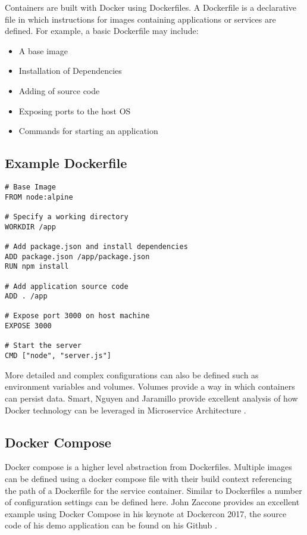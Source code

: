 \documentclass[journal]{IEEEtran}
\begin{document}
Containers are built with Docker using Dockerfiles\cite{dockerfile}. A Dockerfile is a declarative file in which instructions for images containing applications or services are defined. For example, a basic Dockerfile may include:

\begin{itemize}
\item
A base image

\item
Installation of Dependencies

\item
Adding of source code

\item
Exposing ports to the host OS

\item
Commands for starting an application
\end{itemize}

\subsection*{ Example Dockerfile }

\begin{verbatim}
# Base Image
FROM node:alpine

# Specify a working directory
WORKDIR /app

# Add package.json and install dependencies
ADD package.json /app/package.json
RUN npm install

# Add application source code
ADD . /app

# Expose port 3000 on host machine
EXPOSE 3000

# Start the server
CMD ["node", "server.js"]
\end{verbatim}

More detailed and complex configurations can also be defined such as environment variables and volumes. Volumes provide a way in which containers can persist data. Smart, Nguyen and Jaramillo provide excellent analysis of how Docker technology can be leveraged in Microservice Architecture \cite{LeveragingMicroservicesArchDocker}.

\subsection*{ Docker Compose }
Docker compose is a higher level abstraction from Dockerfiles. Multiple images can be defined using a docker compose file with their build context referencing the path of a Dockerfile for the service container. Similar to Dockerfiles a number of configuration settings can be defined here. John Zaccone provides an excellent example using Docker Compose in his keynote at Dockercon 2017, the source code of his demo application can be found on his Github \cite{dockercompose}.
\end{document}

